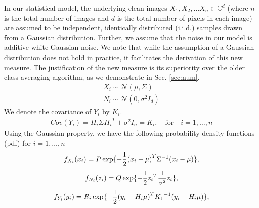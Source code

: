 \documentclass{article}
\begin{document}
In our statistical model, the underlying clean images $X_1, X_2, \ldots X_n \in \mathbb{C}^{d}$ (where $n$ is the total number of images and $d$ is the total number of pixels in each image) are assumed to be independent, identically distributed (i.i.d.) samples drawn from a Gaussian distribution. Further, we assume that the noise in our model is additive white Gaussian noise. We note that while the assumption of a Gaussian distribution does not hold in practice, it facilitates the derivation of this new measure. The justification of the new measure is its superiority over the older class averaging algorithm, as we demonstrate in Sec. \ref{sec:num}.
\begin{eqnarray} 
X_i  \sim \mathcal{N}( {\mu},\Sigma) \nonumber \\ 
N_i  \sim \mathcal{N}(0,{\sigma}^2 I_d )
\end{eqnarray}
We denote the covariance of $Y_i$ by $K_i$.
\begin{eqnarray}
Cov(Y_i) = H_i \Sigma {H_i}^T + {\sigma}^2 I_n = K_i,\quad \text{for} \quad i=1,\ldots,n 
\end{eqnarray}
Using the Gaussian property, we have the following probability density functions (pdf) for $i=1,\ldots,n$
\begin{equation}
\small{
f_{X_i}(x_i) = P \exp\{-\frac{1}{2}{(x_i-\mu)}^T {\Sigma}^{-1}(x_i-\mu)\},}
\end{equation}
\begin{equation}
\small{f_{N_i}(z_i) = Q \exp\{-\frac{1}{2}{z_i}^T \frac{1}{\sigma^2}z_i\},}
\end{equation}
\begin{equation}
\small{f_{Y_i}(y_i) = R_i \exp\{-\frac{1}{2}{(y_i-H_i\mu)}^T {K_1}^{-1}(y_i-H_i\mu)\}, }
\end{equation}
\end{document}
